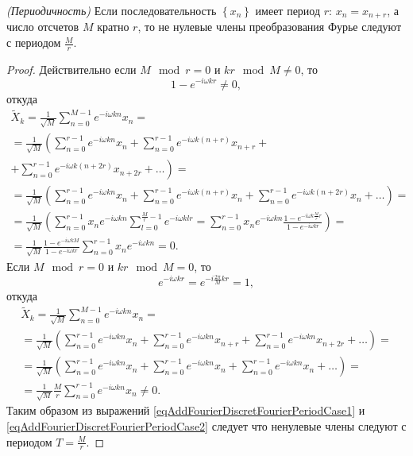\begin{lemma}
\emph{(Периодичность)}
\label{lemmaAddFourierDiscretFourierPeriod}
Если последовательность $\left\{x_n\right\}$ имеет период $r$: $x_n =
x_{n + r}$, а число отсчетов $M$ кратно $r$, то не нулевые члены
преобразования Фурье следуют с периодом $\frac{M}{r}$.
\begin{proof}
Действительно если $M \mod r = 0$ и $k r \mod M \ne 0$,
то
\[
1 - e^{-i \omega k r} \ne 0,
\]
откуда
\begin{eqnarray}
\tilde{X}_k = \frac{1}{\sqrt{M}}\sum_{n = 0}^{M - 1}e^{-i \omega k n}x_n = 
\nonumber \\
= \frac{1}{\sqrt{M}} \left(
\sum_{n = 0}^{r - 1}e^{-i \omega k n} x_n + 
\sum_{n = 0}^{r - 1}e^{-i \omega k \left(n + r \right) } x_{n+r} +
\right.
\nonumber \\
\left. +
\sum_{n = 0}^{r - 1}e^{-i \omega k \left(n + 2r \right) } x_{n+2r} + 
\dots  \right)=
\nonumber \\
= \frac{1}{\sqrt{M}} \left(
\sum_{n = 0}^{r - 1}e^{-i \omega k n} x_n + 
\sum_{n = 0}^{r - 1}e^{-i \omega k \left(n + r \right) } x_n + 
\sum_{n = 0}^{r - 1}e^{-i \omega k \left(n + 2r \right) } x_n + 
\dots \right) =
\nonumber \\
= \frac{1}{\sqrt{M}} \left( \sum_{n = 0}^{r - 1} x_n e^{-i \omega k n} 
\sum_{l = 0}^{\frac{M}{r}- 1} e^{-i \omega k l r } = 
\sum_{n = 0}^{r - 1} x_n e^{-i \omega k n} 
\frac{1 - e^{-i \omega k \frac{M}{r} r }}{1 - e^{-i \omega k r }}
\right) = 
\nonumber \\
=
\frac{1}{\sqrt{M}}
\frac{1 - e^{-i \omega k M }}{1 - e^{-i \omega k r}}
\sum_{n = 0}^{r - 1} x_n e^{-i \omega k n} = 0.
\label{eqAddFourierDiscretFourierPeriodCase1}
\end{eqnarray}
Если $M \mod r = 0$ и $k r \mod M = 0$, то
\[
e^{-i \omega k r } = e^{-i \frac{2 \pi }{M} k r } = 1,
\]
откуда
\begin{eqnarray}
\tilde{X}_k = \frac{1}{\sqrt{M}} \sum_{n = 0}^{M - 1}e^{-i \omega k n}x_n = 
\nonumber \\
= \frac{1}{\sqrt{M}} \left(
\sum_{n = 0}^{r - 1}e^{-i \omega k n} x_n + 
\sum_{n = 0}^{r - 1}e^{-i \omega k n } x_{n+r} + 
\sum_{n = 0}^{r - 1}e^{-i \omega k n } x_{n+2r} + 
\dots \right)=
\nonumber \\
= \frac{1}{\sqrt{M}} \left(
\sum_{n = 0}^{r - 1}e^{-i \omega k n} x_n + 
\sum_{n = 0}^{r - 1}e^{-i \omega k n  } x_n + 
\sum_{n = 0}^{r - 1}e^{-i \omega k n  } x_n + 
\dots \right) = 
\nonumber \\ 
= \frac{1}{\sqrt{M}} \frac{M}{r} \sum_{n = 0}^{r - 1}e^{-i \omega k n  } x_n \ne 0.
\label{eqAddFourierDiscretFourierPeriodCase2}
\end{eqnarray}
Таким образом из выражений 
\eqref{eqAddFourierDiscretFourierPeriodCase1} и 
\eqref{eqAddFourierDiscretFourierPeriodCase2} следует что
ненулевые члены следуют с периодом $T = \frac{M}{r}$.
\end{proof}
\end{lemma}


